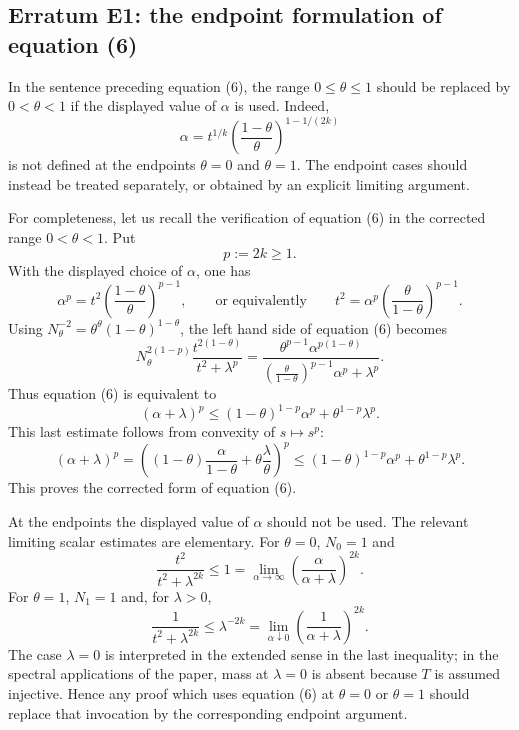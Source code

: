 
\subsection*{Erratum E1: the endpoint formulation of equation (6)}
\label{s:erratum:E1}

In the sentence preceding equation (6), the range
$0 \leq \theta \leq 1$ should be replaced by
$0 < \theta < 1$ if the displayed value of $\alpha$ is used.  Indeed,
\[
	\alpha
	=
	t^{1/k}
	\left(\frac{1-\theta}{\theta}\right)^{1-1/(2k)}
\]
is not defined at the endpoints $\theta=0$ and $\theta=1$.
The endpoint cases should instead be treated separately, or obtained by
an explicit limiting argument.

For completeness, let us recall the verification of equation (6) in
the corrected range $0<\theta<1$.  Put
\[
	p := 2k \geq 1 .
\]
With the displayed choice of $\alpha$, one has
\[
	\alpha^p
	=
	t^2
	\left(\frac{1-\theta}{\theta}\right)^{p-1},
	\qquad\text{or equivalently}\qquad
	t^2
	=
	\alpha^p
	\left(\frac{\theta}{1-\theta}\right)^{p-1} .
\]
Using $N_\theta^{-2}=\theta^\theta(1-\theta)^{1-\theta}$, the left hand
side of equation (6) becomes
\[
	N_\theta^{2(1-p)}
	\frac{t^{2(1-\theta)}}{t^2+\lambda^p}
	=
	\frac{
		\theta^{p-1}\alpha^{p(1-\theta)}
	}{
		\left(\frac{\theta}{1-\theta}\right)^{p-1}\alpha^p
		+
		\lambda^p
	} .
\]
Thus equation (6) is equivalent to
\[
	(\alpha+\lambda)^p
	\leq
	(1-\theta)^{1-p}\alpha^p
	+
	\theta^{1-p}\lambda^p .
\]
This last estimate follows from convexity of $s\mapsto s^p$:
\[
	(\alpha+\lambda)^p
	=
	\left(
		(1-\theta)\frac{\alpha}{1-\theta}
		+
		\theta\frac{\lambda}{\theta}
	\right)^p
	\leq
	(1-\theta)^{1-p}\alpha^p
	+
	\theta^{1-p}\lambda^p .
\]
This proves the corrected form of equation (6).

At the endpoints the displayed value of $\alpha$ should not be used.
The relevant limiting scalar estimates are elementary.  For $\theta=0$,
$N_0=1$ and
\[
	\frac{t^2}{t^2+\lambda^{2k}}
	\leq
	1
	=
	\lim_{\alpha\to\infty}
	\left(\frac{\alpha}{\alpha+\lambda}\right)^{2k} .
\]
For $\theta=1$, $N_1=1$ and, for $\lambda>0$,
\[
	\frac{1}{t^2+\lambda^{2k}}
	\leq
	\lambda^{-2k}
	=
	\lim_{\alpha\downarrow0}
	\left(\frac{1}{\alpha+\lambda}\right)^{2k} .
\]
The case $\lambda=0$ is interpreted in the extended sense in the last
inequality; in the spectral applications of the paper, mass at
$\lambda=0$ is absent because $T$ is assumed injective.  Hence any proof
which uses equation (6) at $\theta=0$ or $\theta=1$ should replace
that invocation by the corresponding endpoint argument.
